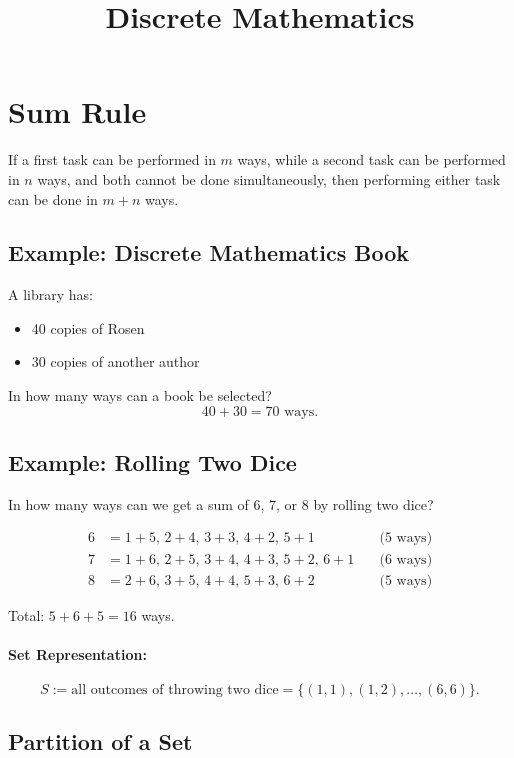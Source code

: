 \documentclass[11pt]{article}
\title{\textbf{Discrete Mathematics}}
\author{}
\date{}
\begin{document}
\maketitle

\section{Sum Rule}

If a first task can be performed in $m$ ways, while a second task can be performed in $n$ ways, and both cannot be done simultaneously, then performing either task can be done in $m + n$ ways.

\subsection*{Example: Discrete Mathematics Book}
A library has:
\begin{itemize}
    \item 40 copies of Rosen
    \item 30 copies of another author
\end{itemize}

In how many ways can a book be selected? 
\[
40 + 30 = 70 \text{ ways.}
\]

\subsection*{Example: Rolling Two Dice}
In how many ways can we get a sum of 6, 7, or 8 by rolling two dice?

\begin{align*}
6 &= 1 + 5, \, 2 + 4, \, 3 + 3, \, 4 + 2, \, 5 + 1 \quad &\text{(5 ways)} \\
7 &= 1 + 6, \, 2 + 5, \, 3 + 4, \, 4 + 3, \, 5 + 2, \, 6 + 1 \quad &\text{(6 ways)} \\
8 &= 2 + 6, \, 3 + 5, \, 4 + 4, \, 5 + 3, \, 6 + 2 \quad &\text{(5 ways)} 
\end{align*}

Total: $5 + 6 + 5 = 16$ ways.

\paragraph{Set Representation:}
\[
S := \text{all outcomes of throwing two dice} = \{(1,1), (1,2), \dots, (6,6)\}.
\]

\subsection{Partition of a Set}
\end{document}
